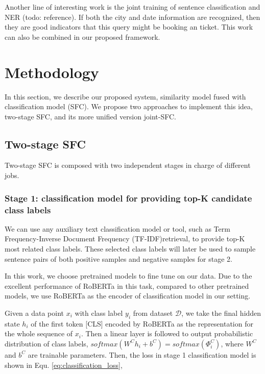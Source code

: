 \documentclass[letterpaper]{article} %
\begin{document}
  Another   line   of  interesting  work  is  the  joint  training  of  sentence
  classification   and  NER  (todo:  reference).  If  both  the  city  and  date
  information  are  recognized,  then  they  are good indicators that this query
  might  be  booking  an  ticket. This work can also be combined in our proposed
  framework.

  \section{Methodology}
  In  this section, we describe our proposed system, similarity model fused with
  classification  model (SFC). We propose two approaches to implement this idea,
  two-stage SFC, and its more unified version joint-SFC.

  \subsection{Two-stage SFC}

  Two-stage   SFC  is  composed  with  two  independent stages  in  charge of
  different  jobs. 

  \subsubsection*{
    Stage 1: classification model for providing top-K candidate class labels
  } 
  We  can  use any auxiliary text classification model or tool,
  such as Term Frequency-Inverse Document Frequency (TF-IDF)retrieval, to
  provide  top-K  most  related  class  labels. These selected class labels will
  later  be  used to sample sentence pairs of both positive samples and negative
  samples  for  stage  2. 

  In  this  work,  we  choose pretrained models to fine tune on our data.
  Due to the excellent performance of RoBERTa in this task, compared to other pretrained
  models, we use RoBERTa as the encoder of classification model in our setting.

  Given   a   data   point   $x_{i}$  with  class  label  $y_{i}$  from  dataset
  $\mathcal{D}$, we take the final hidden state $h_{i}$ of the first token [CLS]
  encoded  by  RoBERTa  as the representation for the whole sequence of $x_{i}$.
  Then  a linear layer is followed to output probabilistic distribution of class
  labels,  $softmax(W^Ch_{i}+b^C)=softmax({\Phi}^C_{i})$,  where $W^C$ and $b^C$
  are  trainable  parameters.  Then, the loss in stage 1 classification model is
  shown in Equ. \ref{eq:classification_loss},
\end{document}

